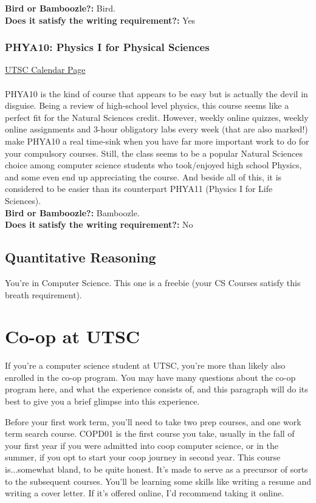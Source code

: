 \documentclass[11pt]{article}
\begin{document}
\textbf{Bird or Bamboozle?:} Bird.\\

\textbf{Does it satisfy the writing requirement?:} Yes

\subsubsection{PHYA10: Physics I for Physical Sciences}
\href{https://utsc.calendar.utoronto.ca/course/PHYA10H3}{UTSC Calendar Page}\\\\
PHYA10 is the kind of course that appears to be easy but is actually
the devil in disguise. Being a review of high-school level physics,
this course seems like a perfect fit for the Natural Sciences credit.
However, weekly online quizzes, weekly online assignments and 3-hour
obligatory labs every week (that are also marked!) make PHYA10 a
real time-sink when you have far more important work to do for your
compulsory courses. Still, the class seems to be a popular Natural
Sciences choice among computer science students who took/enjoyed high
school Physics, and some even end up appreciating the course. And beside
all of this, it is considered to be easier than its counterpart PHYA11
(Physics I for Life Sciences). \\

\textbf{Bird or Bamboozle?:} Bamboozle.\\

\textbf{Does it satisfy the writing requirement?:} No


\subsection{Quantitative Reasoning}
You're in Computer Science. This one is a freebie (your CS Courses
satisfy this breath requirement).

\section{Co-op at UTSC}
If you're a computer science student at UTSC, you're more than likely
also enrolled in the co-op program. You may have many questions about
the co-op program here, and what the experience consists of, and this
paragraph will do its best to give you a brief glimpse into this
experience.

Before your first work term, you'll need to take two prep courses,
and one work term search course. COPD01 is the first course you take,
usually in the fall of your first year if you were admitted into coop
computer science, or in the summer, if you opt to start your coop
journey in second year. This course is...somewhat bland, to be quite
honest. It's made to serve as a precursor of sorts to the subsequent
courses. You'll be learning some skills like writing a resume and
writing a cover letter. If it's offered online, I'd recommend taking it
online.
\end{document}
